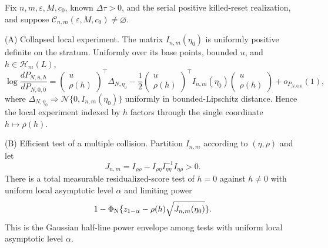 \begin{theorem}
\label{thm:multiple-collision-collapse-main}
Fix \(n,m,\varepsilon,M,c_0\), known \(\Delta\tau>0\), and the serial
positive killed-reset realization, and suppose
\(\mathcal C_{n,m}(\varepsilon,M,c_0)\ne\varnothing\).

\smallskip\noindent\textup{(A) Collapsed local experiment.}
The matrix \(I_{n,m}(\eta_0)\) is uniformly positive definite on the
stratum.  Uniformly over its base points, bounded \(u\), and
\(h\in\mathcal H_m(L)\),
\begin{equation}
 \log\frac{dP_{N,u,h}}{dP_{N,0,0}}
 =\begin{pmatrix}u\\ \rho(h)\end{pmatrix}^{\!\top}\Delta_{N,\eta_0}
 -\frac12\begin{pmatrix}u\\ \rho(h)\end{pmatrix}^{\!\top}
 I_{n,m}(\eta_0)
 \begin{pmatrix}u\\ \rho(h)\end{pmatrix}
 +o_{P_{N,0,0}}(1),
\label{eq:main-multiple-lan}
\end{equation}
where
\(\Delta_{N,\eta_0}\Rightarrow
\mathcal N\{0,I_{n,m}(\eta_0)\}\) uniformly in bounded-Lipschitz
distance.  Hence the local experiment indexed by \(h\) factors through the
single coordinate \(h\mapsto\rho(h)\).

\smallskip\noindent\textup{(B) Efficient test of a multiple collision.}
Partition \(I_{n,m}\) according to \((\eta,\rho)\) and let
\begin{equation}
 J_{n,m}=I_{\rho\rho}
 -I_{\rho\eta}I_{\eta\eta}^{-1}I_{\eta\rho}>0.
\label{eq:main-multiple-schur-complement}
\end{equation}
There is a total measurable residualized-score test of
\(h=0\) against \(h\ne0\) with uniform local asymptotic level
\(\alpha\) and limiting power
\begin{equation}
 1-\Phi_{\rm N}\{z_{1-\alpha}-\rho(h)\sqrt{J_{n,m}(\eta_0)}\}.
\label{eq:main-multiple-power-envelope}
\end{equation}
This is the Gaussian half-line power envelope among tests with uniform local
asymptotic level \(\alpha\).


\end{theorem}
